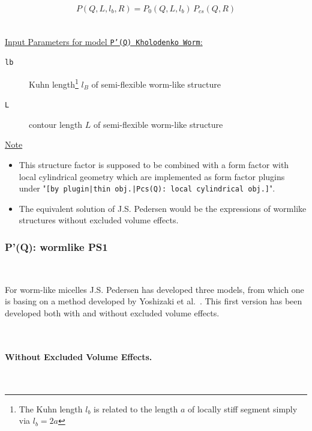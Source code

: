 \begin{align}
P(Q,L,l_b,R) = P_0(Q,L,l_b)\, P_{cs}(Q,R)
\end{align}

\vspace{5mm}

\hspace{1pt}\\
\underline{Input Parameters for model \texttt{P'(Q) Kholodenko Worm}:}\\
\begin{description}
\item[\texttt{lb}] Kuhn length\footnote{The Kuhn length $l_b$ is related to the length $a$ of
    locally stiff segment simply via $l_b=2a$} $l_B$ of semi-flexible worm-like structure
\item[\texttt{L}] contour length $L$ of semi-flexible worm-like structure
\end{description}

\noindent
\underline{Note}
\begin{itemize}
  \item This structure factor is supposed to be combined with a form factor with local cylindrical geometry which are implemented as form factor plugins
under "\texttt{[by plugin|thin obj.|Pcs(Q): local cylindrical obj.]}".
\item The equivalent solution of J.S. Pedersen \cite{Pedersen96Macrom} would be the expressions of wormlike structures without excluded volume effects.
\end{itemize}

\clearpage
\subsubsection{P'(Q): wormlike PS1} ~\\
\label{plugin:Pprime4wormPS1}

For worm-like micelles J.S. Pedersen \cite{Pedersen96Macrom} has developed three models, from which one is basing on a method developed by Yoshizaki et al.\ \cite{Yoshizaki1980}. This first version has been developed both with and without excluded volume effects.

~\\
\paragraph*{\textbf{Without Excluded Volume Effects.}}~\\

